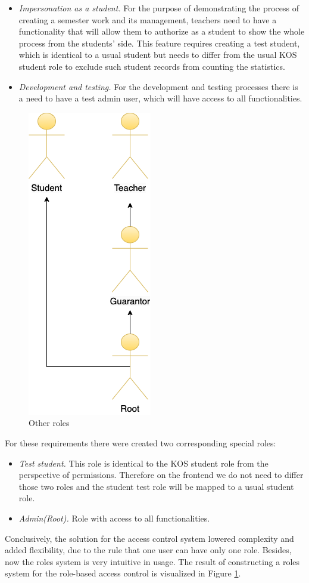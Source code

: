 \begin{itemize}
    \item \emph{Impersonation as a student.} For the purpose of demonstrating the process of creating a semester work and its management, teachers need to have a functionality that will allow them to authorize as a student to show the whole process from the students' side. This feature requires creating a test student, which is identical to a usual student but needs  to differ from the usual KOS student role to exclude such student records from counting the statistics. 
    \item \emph{Development and testing.} For the development and testing processes there is a need to have a test admin user, which will have access to all functionalities. 
\end{itemize}

\begin{figure}[h]
\centering
\includegraphics[scale=0.54]{../png/roles.png}
\caption{Other roles}\label{picture:special_roles}
\end{figure}


\noindent For these requirements there were created two corresponding special roles:

\begin{itemize}
    \item \emph{Test student.} This role is identical to the KOS student role from the perspective of permissions. Therefore on the frontend we do not need to differ those two roles and the student test role will be mapped to a usual student role.
    \item \emph{Admin(Root).} Role with access to all functionalities.
\end{itemize}

\noindent Conclusively, the solution for the access control system lowered complexity and added flexibility, due to the rule that one user can have only one role. Besides, now the roles system is very intuitive in usage. The result of constructing a roles system for the role-based access control is visualized in Figure \ref{picture:special_roles}.
